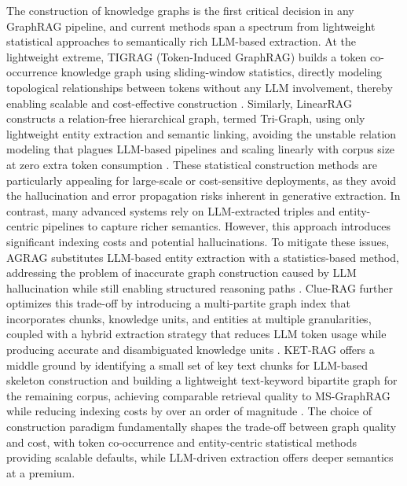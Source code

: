 \documentclass[11pt]{article}
\begin{document}
The construction of knowledge graphs is the first critical decision in any GraphRAG pipeline, and current methods span a spectrum from lightweight statistical approaches to semantically rich LLM-based extraction. At the lightweight extreme, TIGRAG (Token-Induced GraphRAG) builds a token co-occurrence knowledge graph using sliding-window statistics, directly modeling topological relationships between tokens without any LLM involvement, thereby enabling scalable and cost-effective construction \cite{ref284}. Similarly, LinearRAG constructs a relation-free hierarchical graph, termed Tri-Graph, using only lightweight entity extraction and semantic linking, avoiding the unstable relation modeling that plagues LLM-based pipelines and scaling linearly with corpus size at zero extra token consumption \cite{ref285}. These statistical construction methods are particularly appealing for large-scale or cost-sensitive deployments, as they avoid the hallucination and error propagation risks inherent in generative extraction. In contrast, many advanced systems rely on LLM-extracted triples and entity-centric pipelines to capture richer semantics. However, this approach introduces significant indexing costs and potential hallucinations. To mitigate these issues, AGRAG substitutes LLM-based entity extraction with a statistics-based method, addressing the problem of inaccurate graph construction caused by LLM hallucination while still enabling structured reasoning paths \cite{ref286}. Clue-RAG further optimizes this trade-off by introducing a multi-partite graph index that incorporates chunks, knowledge units, and entities at multiple granularities, coupled with a hybrid extraction strategy that reduces LLM token usage while producing accurate and disambiguated knowledge units \cite{ref287}. KET-RAG offers a middle ground by identifying a small set of key text chunks for LLM-based skeleton construction and building a lightweight text-keyword bipartite graph for the remaining corpus, achieving comparable retrieval quality to MS-GraphRAG while reducing indexing costs by over an order of magnitude \cite{ref288}. The choice of construction paradigm fundamentally shapes the trade-off between graph quality and cost, with token co-occurrence and entity-centric statistical methods providing scalable defaults, while LLM-driven extraction offers deeper semantics at a premium.
\end{document}
